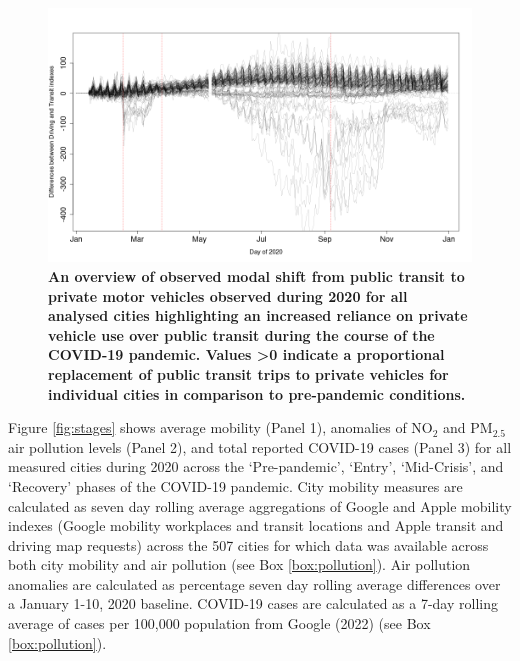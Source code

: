 \documentclass[preprint,10pt]{elsarticle} %
\begin{document}
\begin{figure}
\centering
\includegraphics[trim={0 0 0 0},clip,scale=0.4]{Images2/DrivingMinusTransit.png}
\caption{\bf An overview of observed modal shift from public transit to private motor vehicles observed during 2020 for all analysed cities highlighting an increased reliance on private vehicle use over public transit during the course of the COVID-19 pandemic. Values \textgreater 0 indicate a proportional replacement of public transit trips to private vehicles for individual cities in comparison to pre-pandemic conditions.}  
 \label{fig:driv_trans}
\end{figure}


Figure \ref{fig:stages} shows average mobility (Panel 1), anomalies of NO$_{2}$ and PM$_{2.5}$ air pollution levels (Panel 2), and total reported COVID-19 cases (Panel 3) for all measured cities during 2020 across the `Pre-pandemic', `Entry', `Mid-Crisis', and `Recovery' phases of the COVID-19 pandemic. City mobility measures are calculated as seven day rolling average aggregations of Google and Apple mobility indexes (Google mobility workplaces and transit locations and Apple transit and driving map requests) across the 507 cities for which data was available across both city mobility and air pollution (see Box \ref{box:pollution}). Air pollution anomalies are calculated as percentage seven day rolling average differences over a January 1-10, 2020 baseline. COVID-19 cases are calculated as a 7-day rolling average of cases per 100,000 population from Google (2022)\cite{Google2022} (see Box \ref{box:pollution}).
\end{document}
